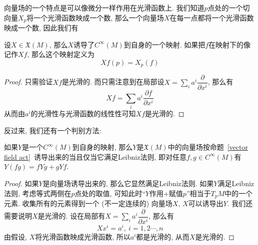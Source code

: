 向量场的一个特点是可以像微分一样作用在光滑函数上.
我们知道$p$点处的一个切向量$X_p$将一个光滑函数映成一个数, 那么一个向量场$X$在每一点都将一个光滑函数映成一个数,
因此我们有
\begin{prop}\label{vector field act}
    设$X\in\mathfrak{X}(M)$, 那么$X$诱导了$C^\infty(M)$到自身的一个映射.
    如果把$f$在映射下的像记作$Xf$, 那么这个映射定义为
    \[Xf(p)=X_p(f)\]
\end{prop}
\begin{proof}
    只需验证$Xf$是光滑的.
    而只需注意到在局部设$\displaystyle X=\sum_{i}a^i\dfrac{\partial}{\partial x^i}$, 那么有
    \[Xf=\sum_{i}a^i\frac{\partial f}{\partial x^i}\]
    从而由$a^i$的光滑性与光滑函数的线性性可知$Xf$是光滑的.
\end{proof}
反过来, 我们还有一个判别方法:
\begin{prop}
    如果$Y$是一个$C^\infty(M)$到自身的映射, 那么$Y$是$\mathfrak{X}(M)$中的向量场按命题~\ref{vector field act}~诱导出来的当且仅当它满足Leibniz法则, 即对任意$f,g\in C^\infty(M)$有$Y(fg)=fYg+gYf$.
\end{prop}
\begin{proof}
    如果$Y$是向量场诱导出来的, 那么它显然满足Leibniz法则.
    如果$Y$满足Leibniz法则, 考虑等式两侧在$p$点处的取值, 可知此时``$Y$作用+赋值$p$''相当于$T_pM$中的一个元素.
    收集所有的元素得到一个 (不一定连续的) 向量场$X$, $X$可以诱导出$Y$.
    我们还需要说明$X$是光滑的.
    设在局部有$\displaystyle X=\sum_{i}a^i\dfrac{\partial}{\partial x^i}$, 那么有
    \[Xx^i=a^i,\ i=1,2\cdots,n\]
    由假设, $X$将光滑函数映成光滑函数, 所以$a^i$都是光滑的, 从而$X$是光滑的.
\end{proof}

